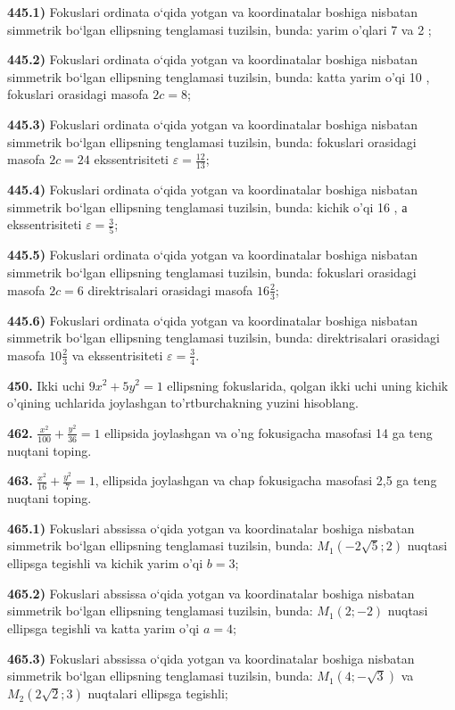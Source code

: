 \textbf{445.1)} Fokuslari ordinata o‘qida yotgan va koordinatalar boshiga nisbatan simmetrik bo‘lgan ellipsning tenglamasi tuzilsin, bunda: yarim o'qlari 7 va 2 ;

\textbf{445.2)} Fokuslari ordinata o‘qida yotgan va koordinatalar boshiga nisbatan simmetrik bo‘lgan ellipsning tenglamasi tuzilsin, bunda: katta yarim o'qi 10 , fokuslari orasidagi masofa $2 c=8$;

\textbf{445.3)} Fokuslari ordinata o‘qida yotgan va koordinatalar boshiga nisbatan simmetrik bo‘lgan ellipsning tenglamasi tuzilsin, bunda: fokuslari orasidagi masofa $2 c=24$ ekssentrisiteti $\varepsilon=\frac{12}{13}$;

\textbf{445.4)} Fokuslari ordinata o‘qida yotgan va koordinatalar boshiga nisbatan simmetrik bo‘lgan ellipsning tenglamasi tuzilsin, bunda: kichik o'qi 16 , а ekssentrisiteti $\varepsilon=\frac{3}{5}$;

\textbf{445.5)} Fokuslari ordinata o‘qida yotgan va koordinatalar boshiga nisbatan simmetrik bo‘lgan ellipsning tenglamasi tuzilsin, bunda: fokuslari orasidagi masofa $2 c=6$ direktrisalari orasidagi masofa $16 \frac{2}{3}$;

\textbf{445.6)} Fokuslari ordinata o‘qida yotgan va koordinatalar boshiga nisbatan simmetrik bo‘lgan ellipsning tenglamasi tuzilsin, bunda: direktrisalari orasidagi masofa $10 \frac{2}{3}$ va ekssentrisiteti $\varepsilon=\frac{3}{4}$.

\textbf{450.} Ikki uchi $9 x^2+5 y^2=1$ ellipsning fokuslarida, qolgan ikki uchi uning kichik o'qining uchlarida joylashgan to'rtburchakning yuzini hisoblang.

\textbf{462.} $\frac{x^2}{100}+\frac{y^2}{36}=1$ ellipsida joylashgan va o'ng fokusigacha masofasi 14 ga teng nuqtani toping.

\textbf{463.} $\frac{x^2}{16}+\frac{y^2}{7}=1$, ellipsida joylashgan va chap fokusigacha masofasi 2,5 ga teng nuqtani toping.

\textbf{465.1)} Fokuslari abssissa o‘qida yotgan va koordinatalar boshiga nisbatan simmetrik bo‘lgan ellipsning tenglamasi tuzilsin, bunda: $M_1(-2 \sqrt{5} ; 2)$ nuqtasi ellipsga tegishli va kichik yarim o'qi $b=3$;

\textbf{465.2)} Fokuslari abssissa o‘qida yotgan va koordinatalar boshiga nisbatan simmetrik bo‘lgan ellipsning tenglamasi tuzilsin, bunda: $M_1(2 ;-2)$ nuqtasi ellipsga tegishli va katta yarim o'qi $a=4$;

\textbf{465.3)} Fokuslari abssissa o‘qida yotgan va koordinatalar boshiga nisbatan simmetrik bo‘lgan ellipsning tenglamasi tuzilsin, bunda: $M_1(4 ;-\sqrt{3})$ va $M_2(2 \sqrt{2} ; 3)$ nuqtalari ellipsga tegishli;

